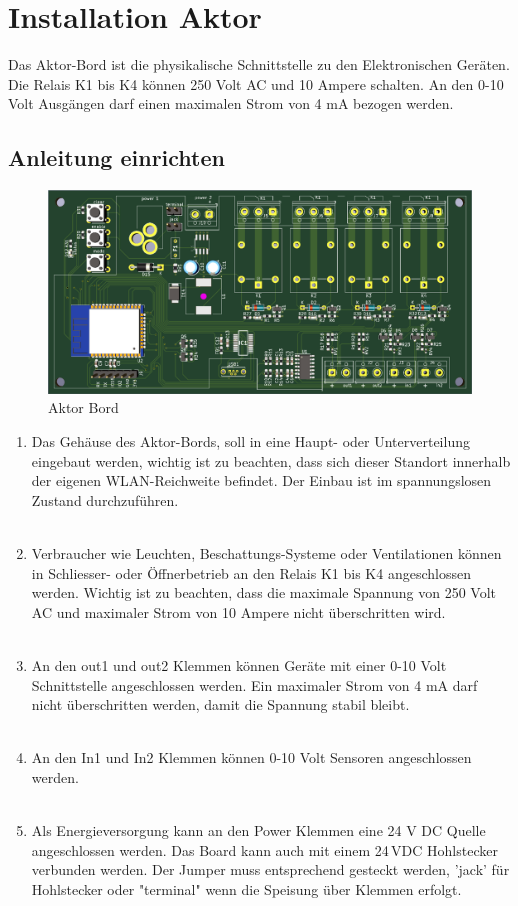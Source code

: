 \clearpage
\section{Installation Aktor}\label{sec:Aktor}
Das Aktor-Bord ist die physikalische Schnittstelle zu den Elektronischen Geräten. Die Relais K1 bis K4 können 250 Volt AC und 10 Ampere schalten. An den 0-10 Volt Ausgängen darf einen maximalen Strom von 4 mA bezogen werden.
\subsection{Anleitung einrichten}
\begin{figure}[H]
	\centering
	\includegraphics[width=\textwidth]{graphics/Aktorbaustein.png}
	\caption{Aktor Bord} 	
	\label{pic: OSGILayers}
\end{figure} 

\begin{enumerate}
	\item Das Gehäuse des Aktor-Bords, soll in eine Haupt- oder Unterverteilung eingebaut werden, wichtig ist zu beachten, dass sich dieser Standort innerhalb der eigenen WLAN-Reichweite befindet. Der Einbau ist im spannungslosen Zustand durchzuführen. \\
	\\
	\item Verbraucher wie Leuchten, Beschattungs-Systeme oder Ventilationen können in Schliesser- oder Öffnerbetrieb an den Relais K1 bis K4 angeschlossen werden. Wichtig ist zu beachten, dass die maximale Spannung von 250 Volt AC und maximaler Strom von 10 Ampere nicht überschritten wird.\\
		\\
	\item An den out1 und out2 Klemmen können Geräte mit einer 0-10 Volt Schnittstelle angeschlossen werden. Ein maximaler Strom von 4 mA darf nicht überschritten werden, damit die Spannung stabil bleibt.\\
	\\
	\item An den In1 und In2 Klemmen können 0-10 Volt Sensoren angeschlossen werden.\\
	\\
	\item Als Energieversorgung kann an den Power Klemmen eine 24 V DC Quelle angeschlossen werden. Das Board kann auch mit einem 24\,VDC Hohlstecker verbunden werden. Der Jumper muss entsprechend gesteckt werden, 'jack' für Hohlstecker oder "terminal" wenn die Speisung über Klemmen erfolgt. 
\end{enumerate}

